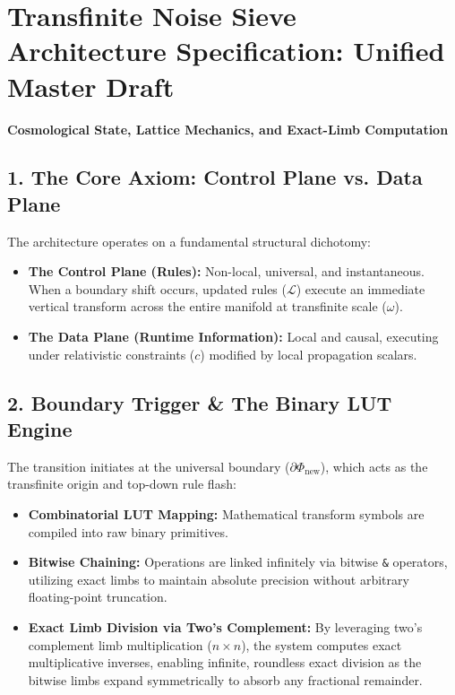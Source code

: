 \chapter{\texorpdfstring{Transfinite Noise Sieve Architecture Specification: Unified Master Draft}{Transfinite Noise Sieve Architecture Specification: Unified Master Draft}}
\label{chap:noise-sieve-2-lut-beamformer-collapse}

\textbf{Cosmological State, Lattice Mechanics, and Exact-Limb Computation}

\medskip

\section{\texorpdfstring{1. The Core Axiom: Control Plane vs. Data Plane}{1. The Core Axiom: Control Plane vs. Data Plane}}

The architecture operates on a fundamental structural dichotomy:

\begin{itemize}
\item \textbf{The Control Plane (Rules):} Non-local, universal, and instantaneous. When a boundary shift occurs, updated rules (\(\mathcal{L}\)) execute an immediate vertical transform across the entire manifold at transfinite scale (\(\omega\)).
\item \textbf{The Data Plane (Runtime Information):} Local and causal, executing under relativistic constraints (\(c\)) modified by local propagation scalars.
\end{itemize}

\medskip

\section{\texorpdfstring{2. Boundary Trigger \& The Binary LUT Engine}{2. Boundary Trigger \& The Binary LUT Engine}}

The transition initiates at the universal boundary (\(\partial\Phi_{\text{new}}\)), which acts as the transfinite origin and top-down rule flash:

\begin{itemize}
\item \textbf{Combinatorial LUT Mapping:} Mathematical transform symbols are compiled into raw binary primitives.
\item \textbf{Bitwise Chaining:} Operations are linked infinitely via bitwise \texttt{\&} operators, utilizing exact limbs to maintain absolute precision without arbitrary floating-point truncation.
\item \textbf{Exact Limb Division via Two's Complement:} By leveraging two's complement limb multiplication (\(n \times n\)), the system computes exact multiplicative inverses, enabling infinite, roundless exact division as the bitwise limbs expand symmetrically to absorb any fractional remainder.
\end{itemize}

